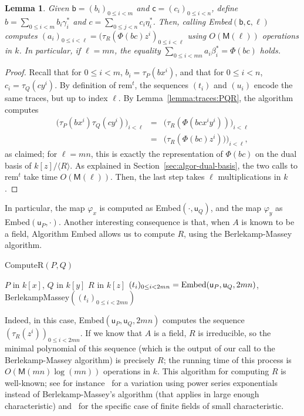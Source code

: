 \documentclass{sig-alternate}
\def\M {\ensuremath{\mathsf{M}}}
\def\vu {\ensuremath{\mathsf{u}}}
\def\vb {\ensuremath{\mathsf{b}}}
\def\vc {\ensuremath{\mathsf{c}}}
\def\rem {\ensuremath{\mathrm{rem}}}
\newcommand{\ang}[1]{\langle#1\rangle}
\newtheorem{Lemma}{Lemma}
\begin{document}
\begin{Lemma}\label{lemma:algo:embed}
  Given $\vb=(b_i)_{0 \le i < m}$ and $\vc = (c_i)_{0 \le i < n}$,
  define $b=\sum_{0 \le i<m} b_i \gamma^\ast_i$ and $c=\sum_{0 \le j
    <n} c_i \eta^\ast_i$. Then, calling {\em Embed}$(\vb,\vc,\ell)$
  computes $(a_i)_{0 \le i < \ell}=(\tau_R(\Phi(bc)z^i)_{0 \le i <
    \ell}$ using $O(\M(\ell))$ operations in $k$. In particular, if
  $\ell=mn$, the equality $\sum_{0 \le i < mn} a_i \beta^\ast_i =
  \Phi(bc)$ holds.
\end{Lemma}
\begin{proof}
  Recall that for $0 \le i <m$, $b_i = \tau_P(bx^i)$, and that for $0
  \le i < n$, $c_i = \tau_Q(cy^i)$. By definition of $\rem^t$, the
  sequences $(t_i)$ and $(u_i)$ encode the same traces, but up to
  index $\ell$.  By Lemma~\ref{lemma:traces:PQR}, the algorithm
  computes
  \begin{eqnarray*}
    \bigl(\tau_P(bx^i)\tau_Q(cy^i)\bigr)_{i<\ell} &=&  \bigl(\tau_R(\Phi(bc x^i y^i))\bigr)_{i<\ell}\\
    &=&  \bigl(\tau_R(\Phi(bc) z^i))\bigr)_{i<\ell},
  \end{eqnarray*}
  as claimed; for $\ell=mn$, this is exactly the representation of
  $\Phi(bc)$ on the dual basis of $k[z]/\ang{R}$. As explained in
  Section~\ref{sec:algor-dual-basis}, the two calls to $\rem^t$ take
  time $O(\M(\ell))$. Then, the last step takes $\ell$
  multiplications in $k$.
\end{proof}

In particular, the map $\varphi_x$ is computed as
Embed$(\cdot,\vu_Q)$, and the map $\varphi_y$ as
Embed$(\vu_P,\cdot)$. Another interesting consequence is that, when
$A$ is known to be a field, Algorithm Embed allows us to compute $R$,
using the Berlekamp-Massey algorithm.

\begin{algorithm}[H]
  \caption{ComputeR$(P,Q)$}
  \begin{algorithmic}[1]
    \REQUIRE $P$ in $k[x]$, $Q$ in $k[y]$
    \ENSURE $R$ in $k[z]$
    \STATE $(t_i)_{0 \le i < 2mn}={\rm Embed}(\vu_P,\vu_Q,2mn)$,
    \RETURN BerlekampMassey$((t_i)_{0 \le i < 2mn})$
  \end{algorithmic}
  \label{algo:R}
\end{algorithm}

Indeed, in this case, Embed$(\vu_P,\vu_Q,2mn)$ computes the sequence
$(\tau_R(z^i))_{0\le i < 2mn}$. If we know that $A$ is a field, $R$ is
irreducible, so the minimal polynomial of this sequence (which is the
output of our call to the Berlekamp-Massey algorithm) is precisely
$R$; the running time of this process is $O(\M(mn)\log(mn))$
operations in $k$. This algorithm for computing $R$ is well-known; see
for instance~\cite{BoFlSaSc06} for a variation using power series
exponentials instead of Berlekamp-Massey's algorithm (that applies in
large enough characteristic) and~\cite{BGPS05} for the specific case
of finite fields of small characteristic.
\end{document}
